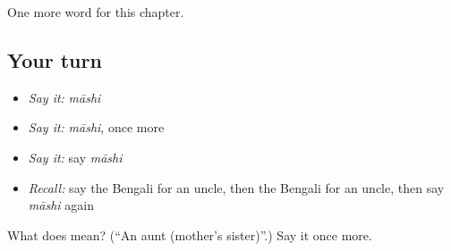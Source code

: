 \begin{grammarlens}[title={What you've built}]
One more word for this chapter.
\end{grammarlens}

\subsection*{Your turn}
\begin{itemize}
\raggedright
  \item \emph{Say it:} \emph{māshi}
  \item \emph{Say it:} \emph{māshi}, once more
  \item \emph{Say it:} say \emph{māshi}
  \item \emph{Recall:} say the Bengali for an uncle, then the Bengali for an uncle, then say \emph{māshi} again
\end{itemize}

\begin{tcolorbox}[breakable,colback=teal!4,colframe=teal!35!black,title={Before you move on}]
What does  mean? (\textquotedblleft{}An aunt (mother's sister)\textquotedblright{}.) Say it once more.
\end{tcolorbox}
